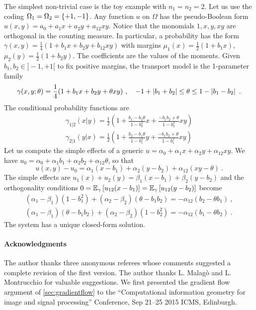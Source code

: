 \documentclass[runningheads]{llncs}
\begin{document}
\begin{remark}
  The simplest non-trivial case is the toy example with $n_1=n_2=2$. Let us use the coding $\Omega_1=\Omega_2=\left\{ +1,-1 \right\}$. Any function $u$ on $\Omega$ has the pseudo-Boolean form $u(x,y)=a_0+a_1 x + a_2 y + a_{12} xy$. Notice that the monomials $1,x,y,xy$ are orthogonal in the counting measure. In particular, a probability has the form $\gamma(x,y) = \frac14(1+b_1x+b_2y+b_{12}xy)$ with margins $\mu_1(x) = \frac12(1+b_1x)$, $\mu_2(y) = \frac12(1+b_2y)$. The coefficients are the values of the moments. Given $b_1, b_2 \in ]-1,+1[$ to fix positive margins, the transport model is the 1-parameter family
\begin{equation*} \gamma(x,y;\theta) = \frac14(1+ b_1x+ b_2y+\theta xy)\ , \quad -1 + \left| b_1+b_2 \right| \leq \theta \leq 1 - \left| b_1 - b_2 \right| \ . \end{equation*}
The conditional probability functions are
\begin{gather*} \gamma_{1|2}(x|y) = \frac12 \left(1+\frac{b_1-b_2\theta}{1-b_2^2}x+\frac{-b_1b_2 + \theta}{1-b_2^2}xy\right) \\ \gamma_{2|1}(y|x) = \frac12 \left(1+\frac{b_2-b_1\theta}{1-b_1^2}y+\frac{-b_1b_2 + \theta}{1-b_1^2}xy\right) \end{gather*}
Let us compute the simple effects of a generic $u = \alpha_0 + \alpha_1 x + \alpha_2 y + \alpha_{12} xy$. We have $u_0 = \alpha_0 + \alpha_1 b_1 + \alpha_2 b_2 + \alpha_{12} \theta$, so that
\begin{equation*}
  u(x,y) - u_0 = \alpha_1 (x - b_1) + \alpha_2(y-b_2) + \alpha_{12} (xy - \theta) \ .
\end{equation*}
The simple effects are $u_1(x) + u_2(y) = \beta_1 (x - b_1) + \beta_2(y-b_2)$ and the orthogonality conditions $0 = {\operatorname{\mathbb E}}_{\gamma}\left[u_{12}(x - b_1)\right] = {\operatorname{\mathbb E}}_{\gamma}\left[u_{12}(y-b_2)\right]$ become
\begin{gather*}
  (\alpha_1-\beta_1)(1-b_1^2)+(\alpha_2-\beta_2)(\theta-b_1b_2) = - \alpha_{12}(b_2-\theta b_1) \ , \\
  (\alpha_1-\beta_1)(\theta-b_1b_2)+(\alpha_2-\beta_2)(1 - b_2^2)= - \alpha_{12}(b_1-\theta b_2) \ . 
\end{gather*}
The system has a unique closed-form solution. 
\end{remark}

\paragraph{Acknowledgments}
The author thanks three anonymous referees whose comments suggested a complete revision of the first version. The author thanks L. Malag\`o and L. Montrucchio for valuable suggestions. We first presented the gradient flow argument of \cref{sec:gradientflow} to the ``Computational information geometry for image and signal processing'' Conference, Sep 21--25 2015 ICMS, Edinburgh.



%
\end{document}
